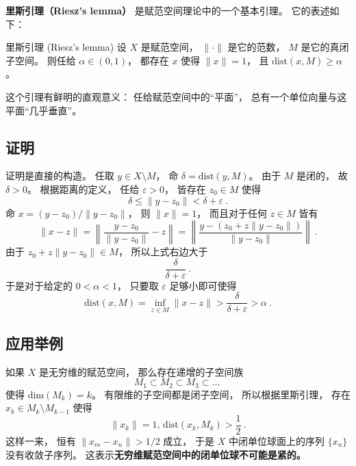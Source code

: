 
\begin{issues}
\issueNeedCite
\end{issues}


\textbf{里斯引理（Riesz's lemma）} 是赋范空间理论中的一个基本引理。 它的表述如下：

\begin{lemma}{里斯引理 (Riesz's lemma)}
设 $X$ 是赋范空间， $\|\cdot\|$ 是它的范数， $M$ 是它的真闭子空间。 则任给 $\alpha\in(0,1)$， 都存在 $x$ 使得 $\|x\|=1$， 且 $\text{dist}(x,M)\geq\alpha$。
\end{lemma}

这个引理有鲜明的直观意义： 任给赋范空间中的“平面”， 总有一个单位向量与这平面“几乎垂直”。

\subsection{证明}
证明是直接的构造。 任取 $y\in X\setminus M$， 命 $\delta=\text{dist}(y,M)$。 由于 $M$ 是闭的， 故 $\delta>0$。 根据距离的定义， 任给 $\varepsilon>0$， 皆存在 $z_0\in M$ 使得
$$
\delta\leq \|y-z_0\|<\delta+\varepsilon~.
$$
命 $x=(y-z_0)/\|y-z_0\|$， 则 $\|x\|=1$， 而且对于任何 $z\in M$ 皆有
$$
\|x-z\|
=\left\|\frac{y-z_0}{\|y-z_0\|}-z\right\|
=\left\|\frac{y-(z_0+z\|y-z_0\|)}{\|y-z_0\|}\right\|~.
$$
由于 $z_0+z\|y-z_0\|\in M$， 所以上式右边大于
$$
\frac{\delta}{\delta+\varepsilon}~.
$$
于是对于给定的 $0<\alpha<1$， 只要取 $\varepsilon$ 足够小即可使得
$$
\text{dist}(x,M)
=\inf_{z\in M}\|x-z\|
>\frac{\delta}{\delta+\varepsilon}
>\alpha~.
$$

\subsection{应用举例}
如果 $X$ 是无穷维的赋范空间， 那么存在递增的子空间族
$$
M_1\subset M_2\subset M_3\subset...~
$$
使得 $\text{dim}(M_k)=k$。 有限维的子空间都是闭子空间， 所以根据里斯引理， 存在 $x_k\in M_k\setminus M_{k-1}$ 使得
$$
\|x_k\|=1,\,\text{dist}(x_k,M_k)>\frac{1}{2}~.
$$
这样一来， 恒有 $\|x_m-x_n\|>1/2$ 成立， 于是 $X$ 中闭单位球面上的序列 $\{x_n\}$ 没有收敛子序列。 这表示\textbf{无穷维赋范空间中的闭单位球不可能是紧的。}
